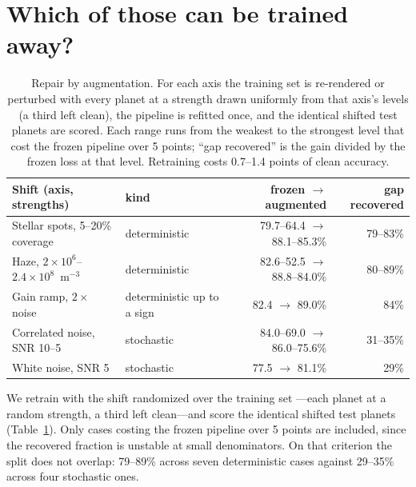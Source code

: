 \documentclass{article}
\begin{document}
\section{Which of those can be trained away?}

\begin{table}[t]
  \caption{Repair by augmentation. For each axis the training set is re-rendered or perturbed with every planet at a strength drawn uniformly from that axis's levels (a third left clean), the pipeline is refitted once, and the identical shifted test planets are scored. Each range runs from the weakest to the strongest level that cost the frozen pipeline over 5 points; ``gap recovered'' is the gain divided by the frozen loss at that level. Retraining costs 0.7--1.4 points of clean accuracy.}
  \label{tab:repair}
  \centering
  \small
  \begin{tabular}{llrr}
    \toprule
    Shift (axis, strengths) & kind & frozen $\to$ augmented & gap recovered \\
    \midrule
    Stellar spots, 5--20\% coverage & deterministic & 79.7--64.4 $\to$ 88.1--85.3\% & 79--83\% \\
    Haze, $2 \times 10^{6}$--$2.4 \times 10^{8}$~m$^{-3}$ & deterministic & 82.6--52.5 $\to$ 88.8--84.0\% & 80--89\% \\
    Gain ramp, $2\times$ noise & deterministic up to a sign & 82.4 $\to$ 89.0\% & 84\% \\
    Correlated noise, SNR 10--5 & stochastic & 84.0--69.0 $\to$ 86.0--75.6\% & 31--35\% \\
    White noise, SNR 5 & stochastic & 77.5 $\to$ 81.1\% & 29\% \\
    \bottomrule
  \end{tabular}
\end{table}

We retrain with the shift randomized over the training set \citep{tobin2017}---each planet at a random strength, a third left clean---and score the identical shifted test planets (Table~\ref{tab:repair}). Only cases costing the frozen pipeline over 5 points are included, since the recovered fraction is unstable at small denominators. On that criterion the split does not overlap: 79--89\% across seven deterministic cases against 29--35\% across four stochastic ones.
\end{document}
